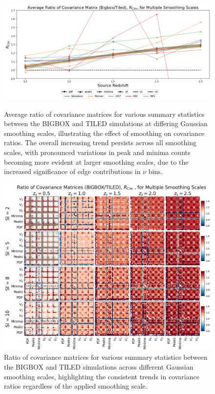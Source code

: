 \begin{figure}[p]
    \centering
    \includegraphics[width=\textwidth]{figures/results/avg_cov_ratio_sl.png}
    \caption[Average BIGBOX/TILED Ratio of Covariance for Multiple Smoothing Scales]
    {Average ratio of covariance matrices for various summary statistics between the BIGBOX and TILED simulations at differing Gaussian smoothing scales, illustrating the effect of smoothing on covariance ratios. The overall increasing trend persists across all smoothing scales, with pronounced variations in peak and minima counts becoming more evident at larger smoothing scales, due to the increased significance of edge contributions in $\nu$ bins.}
    \label{fig:avg_cov_sl}
    \includegraphics[width=\textwidth]{figures/results/cov_smoothing.png}
    \caption[BIGBOX/TILED Ratio of Covariance for Multiple Smoothing Scales]
    {Ratio of covariance matrices for various summary statistics between the BIGBOX and TILED simulations across different Gaussian smoothing scales, highlighting the consistent trends in covariance ratios regardless of the applied smoothing scale.}
    \label{fig:cov_smoothing}
\end{figure}

